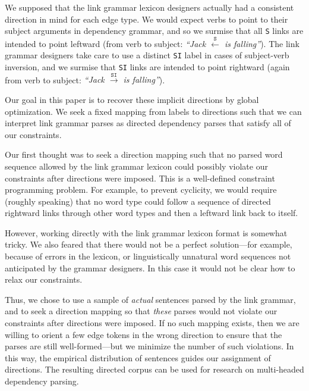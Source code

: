 \documentclass[11pt]{article}
\begin{document}
We supposed that the link grammar lexicon designers actually had a consistent direction in mind for each edge type.  We would expect verbs to point to their subject arguments in dependency grammar, and so we surmise that all \texttt{S} links are intended to point leftward (from verb to subject: {\em ``Jack $\stackrel{\texttt{S}}{\leftarrow}$ is falling''}).  The link grammar designers take care to use a distinct \texttt{SI} label in cases of subject-verb inversion, and we surmise that \texttt{SI} links are intended to point rightward (again from verb to subject: {\em ``Jack $\stackrel{\texttt{SI}}{\rightarrow}$ is falling''}).

Our goal in this paper is to recover these implicit directions by global optimization.  We seek a fixed mapping from labels to directions such that we can interpret link grammar parses as directed dependency parses that satisfy all of our constraints.

Our first thought was to seek a direction mapping such that no parsed word sequence allowed by the link grammar lexicon could possibly violate our constraints after directions were imposed.  This is a well-defined constraint programming problem.  For example, to prevent cyclicity, we would require (roughly speaking) that no word type could follow a sequence of directed rightward links through other word types and then a leftward link back to itself.  

However, working directly with the link grammar lexicon format is somewhat tricky.  We also feared that there would not be a perfect solution---for example, because of errors in the lexicon, or linguistically unnatural word sequences not anticipated by the grammar designers.  In this case it would not be clear how to relax our constraints.

Thus, we chose to use a sample of {\em actual} sentences parsed by the link grammar, and to seek a direction mapping so that {\em these} parses would not violate our constraints after directions were imposed.  If no such mapping exists, then we are willing to orient a few edge tokens in the wrong direction to ensure that the parses are still well-formed---but we minimize the number of such violations.  In this way, the empirical distribution of sentences guides our assignment of directions.  The resulting directed corpus can be used for research on multi-headed dependency parsing.

\end{document}

